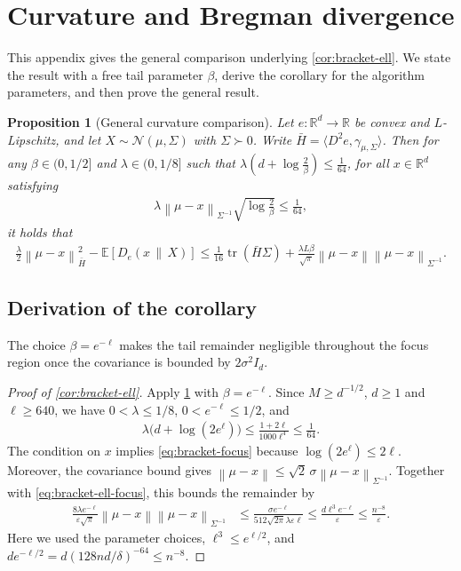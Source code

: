 \documentclass{article}
\newtheorem{proposition}[proposition]{Proposition}
\newcommand{\R}{\mathbb R}
\newcommand{\E}{\mathbb E}
\newcommand{\N}{\mathcal N}
\newcommand{\tr}{\operatorname{tr}}
\newcommand{\1}{\mathbf 1}
\newcommand{\eps}{\varepsilon}
\newcommand{\norm}[1]{\left\lVert #1\right\rVert}
\newcommand{\normm}[2]{\left\lVert #1\right\rVert_{#2}}
\begin{document}
\section{Curvature and Bregman divergence}
\label{app:bracket}
This appendix gives the general comparison underlying \cref{cor:bracket-ell}.
We state the result with a free tail parameter $\beta$, derive the corollary
for the algorithm parameters, and then prove the general result.

\begin{proposition}[General curvature comparison]
    \label{prop:bracket}
    Let $e:\R^d\to\R$ be convex and $L$-Lipschitz, and let
    $X\sim\N(\mu,\Sigma)$ with $\Sigma\succ0$.
    Write $\bar{H}=\langle D^2e,\gamma_{\mu,\Sigma}\rangle$.
    Then for any $\beta\in(0,1/2]$ and $\lambda\in(0, 1/8]$
    such that $\lambda\left(d+\log\frac2\beta\right) \leq \frac{1}{64}$,
    for all $x\in\R^d$ satisfying
    \begin{align}
        \lambda\normm{\mu-x}{\Sigma^{-1}}
        \sqrt{\log\frac2\beta}                \leq \frac{1}{64},
        \label{eq:bracket-focus}
    \end{align}
    it holds that
    \begin{align}
        \frac\lambda2\normm{\mu-x}{\bar{H}}^2
        -\E[D_e(x\,\|\,X)]
        \leq
        \frac1{16}\tr(\bar{H}\Sigma)
        +\frac{\lambda L\beta}{\sqrt{\pi}}
        \norm{\mu-x}\normm{\mu-x}{\Sigma^{-1}}.
        \label{eq:bracket}
    \end{align}
\end{proposition}

\subsection{Derivation of the corollary}
The choice $\beta=e^{-\ell}$ makes the tail remainder negligible throughout
the focus region once the covariance is bounded by $2\sigma^2I_d$.

\begin{proof}[Proof of \cref{cor:bracket-ell}]
    Apply \cref{prop:bracket} with $\beta=e^{-\ell}$.
    Since $M\geq d^{-1/2}$, $d\geq1$ and $\ell\geq640$, we have
    $0<\lambda\leq1/8$, $0<e^{-\ell}\leq1/2$, and
    \begin{align}
        \lambda\bigl(d+\log(2e^\ell)\bigr)
        \leq\frac{1+2\ell}{1000\ell^4}
        \leq\frac1{64}.
    \end{align}
    The condition on $x$ implies \eqref{eq:bracket-focus} because
    $\log(2e^\ell)\leq2\ell$.
    Moreover, the covariance bound gives
    $\norm{\mu-x}\leq\sqrt2\,\sigma\normm{\mu-x}{\Sigma^{-1}}$.
    Together with \eqref{eq:bracket-ell-focus}, this bounds the remainder by
    \begin{align}
        \frac{8\lambda e^{-\ell}}{\eps\sqrt\pi}
        \norm{\mu-x}\normm{\mu-x}{\Sigma^{-1}}
         & \leq\frac{\sigma e^{-\ell}}{512\sqrt{2\pi}\lambda\eps\ell}
        \leq\frac{d\ell^3e^{-\ell}}{\eps}
        \leq\frac{n^{-8}}{\eps}.
    \end{align}
    Here we used the parameter choices, $\ell^3\leq e^{\ell/2}$, and
    $de^{-\ell/2}=d(128nd/\delta)^{-64}\leq n^{-8}$.
\end{proof}
\end{document}
